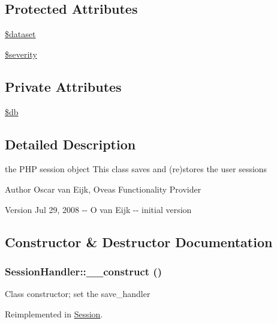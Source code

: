 \subsection*{Protected Attributes}
\begin{DoxyCompactItemize}
\item 
\hyperlink{classSessionHandler_a74c46fcfbadd4c4e6bacc73ddf350056}{\$dataset}
\item 
\hyperlink{class__OWL_ad26b40a9dbbacb33e299b17826f8327c}{\$severity}
\end{DoxyCompactItemize}
\subsection*{Private Attributes}
\begin{DoxyCompactItemize}
\item 
\hyperlink{classSessionHandler_a0bb7c3206f3664f2a4b8e96edf49a3bc}{\$db}
\end{DoxyCompactItemize}


\subsection{Detailed Description}
the PHP session object This class saves and (re)stores the user sessions \begin{DoxyAuthor}{Author}
Oscar van Eijk, Oveas Functionality Provider 
\end{DoxyAuthor}
\begin{DoxyVersion}{Version}
Jul 29, 2008 -\/-\/ O van Eijk -\/-\/ initial version 
\end{DoxyVersion}


\subsection{Constructor \& Destructor Documentation}
\subsubsection[{\_\-\_\-construct}]{\setlength{\rightskip}{0pt plus 5cm}SessionHandler::\_\-\_\-construct ()}\label{classSessionHandler_a546ba6d31a1ce532de13f65aadc3be0e}
Class constructor; set the save\_\-handler 

Reimplemented in \hyperlink{classSession_a36373ba15d6c8f932aeea02d7320d7c8}{Session}.



